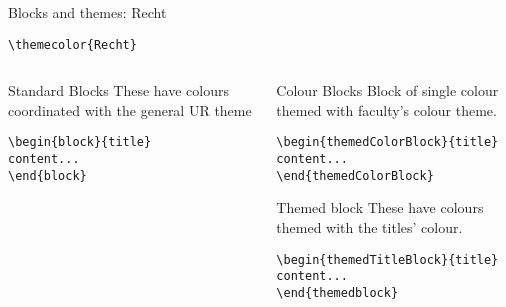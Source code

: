 \begingroup
{}
\begin{frame}[fragile]{Blocks and themes: Recht}
    \begin{center}\verb|\themecolor{Recht}|\end{center}
\begin{columns} %
\begin{column}{0.3\textwidth}
\begin{block}{Standard Blocks}
These have colours coordinated with the general UR theme
\begin{verbatim}
\begin{block}{title}
content...
\end{block}
\end{verbatim}
\end{block}
\end{column}
\begin{column}{0.7\textwidth}
\begin{themedColorBlock}{Colour Blocks}
Block of single colour themed with faculty's colour theme.
\small
\begin{verbatim}
\begin{themedColorBlock}{title}
content...
\end{themedColorBlock}
\end{verbatim}
\end{themedColorBlock}
\begin{themedTitleBlock} {Themed block}
These have colours themed with the titles' colour.
\small
\begin{verbatim}
\begin{themedTitleBlock}{title}
content...
\end{themedblock}
\end{verbatim}
\end{themedTitleBlock}
\end{column}
\end{columns}
\end{frame}
\endgroup


